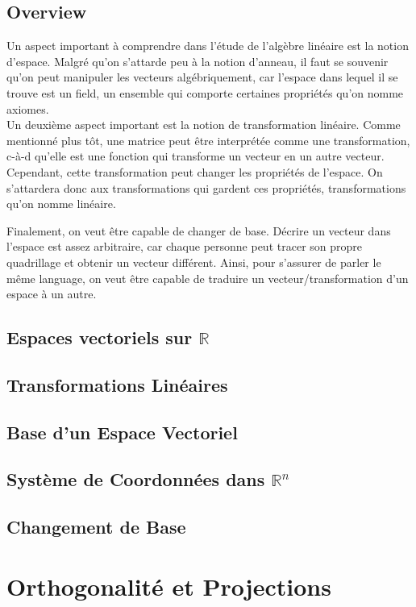 \documentclass{article}
\begin{document}
\subsection{Overview}

Un aspect important à comprendre dans l'étude de l'algèbre linéaire est la notion
d'espace. Malgré qu'on s'attarde peu à la notion d'anneau, il faut se souvenir
qu'on peut manipuler les vecteurs algébriquement, car l'espace dans lequel il se
trouve est un field, un ensemble qui comporte certaines propriétés qu'on nomme
axiomes.\\

Un deuxième aspect important est la notion de transformation linéaire. Comme mentionné
plus tôt, une matrice peut être interprétée comme une transformation, c-à-d qu'elle
est une fonction qui transforme un vecteur en un autre vecteur. Cependant, cette
transformation peut changer les propriétés de l'espace. On s'attardera donc aux
transformations qui gardent ces propriétés, transformations qu'on nomme linéaire.

Finalement, on veut être capable de changer de base. Décrire un vecteur dans
l'espace est assez arbitraire, car chaque personne peut tracer son propre quadrillage
et obtenir un vecteur différent. Ainsi, pour s'assurer de parler le même language,
on veut être capable de traduire un vecteur/transformation d'un espace à un autre.

\subsection{Espaces vectoriels sur $\mathbb{R}$}
\subsection{Transformations Linéaires}
\subsection{Base d'un Espace Vectoriel}
\subsection{Système de Coordonnées dans $\mathbb{R}^n$}
\subsection{Changement de Base}

\pagebreak
\section{Orthogonalité et Projections}
\end{document}
